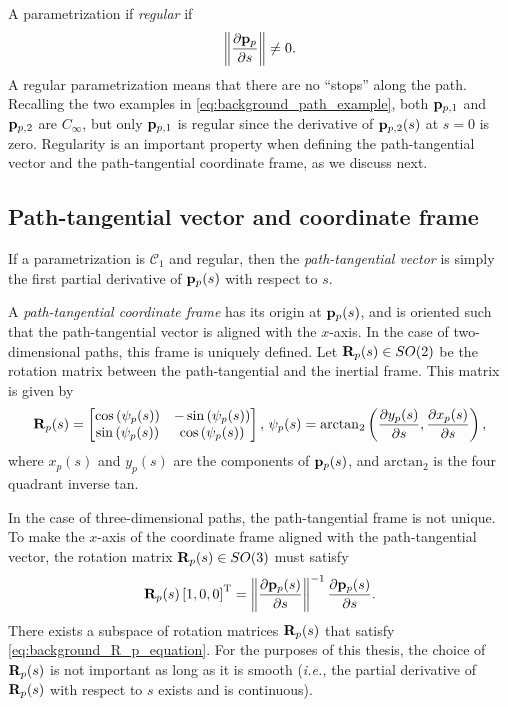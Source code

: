 A parametrization if \emph{regular} if
\begin{equation}
    \left\|\frac{\partial \mathbf{p}_p}{\partial s}\right\| \neq 0.
\end{equation}
A regular parametrization means that there are no ``stops'' along the path.
Recalling the two examples in \eqref{eq:background_path_example}, both $\mathbf{p}_{p, 1}$ and $\mathbf{p}_{p, 2}$ are $C_{\infty}$, but only $\mathbf{p}_{p, 1}$ is regular since the derivative of $\mathbf{p}_{p, 2}(s)$ at $s = 0$ is zero.
Regularity is an important property when defining the path-tangential vector and the path-tangential coordinate frame, as we discuss next.

\subsection{Path-tangential vector and coordinate frame}
\label{sec:background_path_tangential}
If a parametrization is $\mathcal{C}_1$ and regular, then the \emph{path-tangential vector} is simply the first partial derivative of $\mathbf{p}_p(s)$ with respect to $s$.

A \emph{path-tangential coordinate frame} has its origin at $\mathbf{p}_p(s)$, and is oriented such that the path-tangential vector is aligned with the $x$-axis.
In the case of two-dimensional paths, this frame is uniquely defined.
Let $\mathbf{R}_p(s) \in SO(2)$ be the rotation matrix between the path-tangential and the inertial frame.
This matrix is given by
\begin{equation}
    \mathbf{R}_p(s) = 
    \begin{bmatrix}
        \cos\left(\psi_{p}(s)\right) & -\sin\left(\psi_{p}(s)\right) \\ \sin\left(\psi_{p}(s)\right) & \cos\left(\psi_{p}(s)\right)
    \end{bmatrix}, \,
    \psi_{p}(s) = \mathrm{arctan}_{2}\left(\frac{\partial  y_{p}(s)}{\partial s}, \frac{\partial  x_{p}(s)}{\partial s}\right),
\end{equation}
where $x_p(s)$ and $y_p(s)$ are the components of $\mathbf{p}_p(s)$, and $\mathrm{arctan}_2$ is the four quadrant inverse tan.

In the case of three-dimensional paths, the path-tangential frame is not unique.
To make the $x$-axis of the coordinate frame aligned with the path-tangential vector, the rotation matrix $\mathbf{R}_p(s) \in SO(3)$ must satisfy
\begin{equation}
    \mathbf{R}_p(s) \left[1, 0, 0\right]^{\mathrm{T}} = \left\|\frac{\partial \mathbf{p}_p(s)}{\partial s}\right\|^{-1} \frac{\partial \mathbf{p}_p(s)}{\partial s}.
    \label{eq:background_R_p_equation}
\end{equation}
There exists a subspace of rotation matrices $\mathbf{R}_p(s)$ that satisfy \eqref{eq:background_R_p_equation}.
For the purposes of this thesis, the choice of $\mathbf{R}_p(s)$ is not important as long as it is smooth (\emph{i.e.,} the partial derivative of $\mathbf{R}_p(s)$ with respect to $s$ exists and is continuous).

